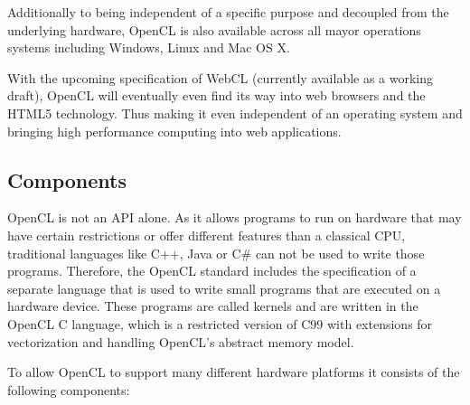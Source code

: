 Additionally to being independent of a specific purpose and decoupled from the underlying hardware, OpenCL is also available across all mayor operations systems including Windows, Linux and Mac OS X.

With the upcoming specification of WebCL (currently available as a working draft), OpenCL will eventually even find its way into web browsers and the HTML5 technology. Thus making it even independent of an operating system and bringing high performance computing into web applications.

\subsection{Components}

OpenCL is not an API alone. As it allows programs to run on hardware that may have certain restrictions or offer different features than a classical CPU, traditional languages like C++, Java or C\# can not be used to write those programs. Therefore, the OpenCL standard includes the specification of a separate language that is used to write small programs that are executed on a hardware device. These programs are called kernels and are written in the OpenCL C language, which is a restricted version of C99 with extensions for vectorization and handling OpenCL's abstract memory model.

\pagebreak

To allow OpenCL to support many different hardware platforms it consists of the following components:

